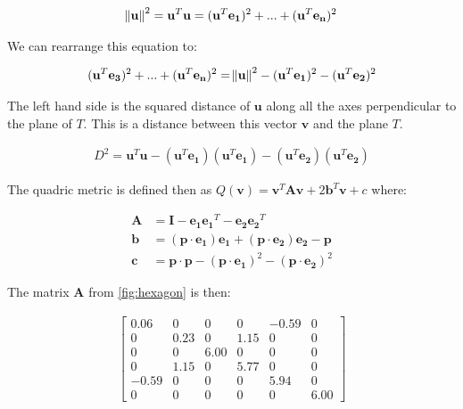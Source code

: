 \begin{align}
\norm{\mathbf{u}}^2 = \mathbf{u}^T\mathbf{u} = (\mathbf{u}^T\mathbf{e_1})^2 + ... +  (\mathbf{u}^T\mathbf{e_n})^2
\end{align}

We can rearrange this equation to:

\begin{align}
(\mathbf{u}^T\mathbf{e_3})^2 + ... +  (\mathbf{u}^T\mathbf{e_n})^2 = \norm{\mathbf{u}}^2 - (\mathbf{u}^T\mathbf{e_1})^2 - (\mathbf{u}^T\mathbf{e_2})^2
\end{align}

The left hand side is the squared distance of $\mathbf{u}$ along all the axes perpendicular to the plane of $T$. This is a distance between this vector $\mathbf{v}$ and the plane $T$.

\begin{align}
D^2 = \mathbf{u}^T\mathbf{u} - (\mathbf{u}^T\mathbf{e_1})(\mathbf{u}^T\mathbf{e_1}) - (\mathbf{u}^T\mathbf{e_2})(\mathbf{u}^T\mathbf{e_2})
\end{align}

The quadric metric is defined then as $Q(\mathbf{v}) = \mathbf{v}^T\mathbf{A}\mathbf{v} + 2\mathbf{b}^T\mathbf{v} + c$ where:

\begin{align}
\mathbf{A} &= \mathbf{I} - \mathbf{e_1}\mathbf{e_1}^T - \mathbf{e_2}\mathbf{e_2}^T\\
\mathbf{b} &= (\mathbf{p} \cdot \mathbf{e_1})\mathbf{e_1} + (\mathbf{p} \cdot \mathbf{e_2})\mathbf{e_2} - \mathbf{p}\\ 
\mathbf{c} &= \mathbf{p} \cdot \mathbf{p} - (\mathbf{p} \cdot \mathbf{e_1})^2 - (\mathbf{p} \cdot \mathbf{e_2})^2 
\end{align}

The matrix $\mathbf{A}$ from \ref{fig:hexagon} is then:

\begin{align}
\left[
\begin{array}{rrrrrr}
0.06 & 0 & 0 & 0 & -0.59 & 0\\
0 & 0.23 & 0 & 1.15 & 0 & 0\\
0 & 0 & 6.00 & 0 & 0 & 0\\
0 & 1.15 & 0 & 5.77 & 0 & 0\\
-0.59 & 0 & 0 & 0 & 5.94 & 0\\
0 & 0 & 0 & 0 & 0 & 6.00
\end{array}\right]
\end{align}

